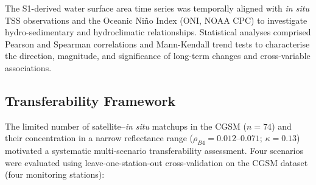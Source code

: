 \documentclass[remotesensing,article,submit,pdftex,moreauthors]{Definitions/mdpi}
\begin{document}
The S1-derived water surface area time series was temporally aligned
with \textit{in situ} TSS observations and the Oceanic Ni\~{n}o Index
(ONI, NOAA CPC) to investigate hydro-sedimentary and hydroclimatic
relationships. Statistical analyses comprised Pearson and Spearman
correlations and Mann-Kendall trend tests to characterise the
direction, magnitude, and significance of long-term changes and
cross-variable associations.
 
 
\subsection{Transferability Framework}
\label{sec:transfer}
 
The limited number of satellite--\textit{in situ} matchups in the CGSM
($n = 74$) and their concentration in a narrow reflectance range
($\rho_{B4} = 0.012$--$0.071$; $\kappa = 0.13$) motivated a systematic
multi-scenario transferability assessment. Four scenarios were
evaluated using leave-one-station-out cross-validation on the CGSM
dataset (four monitoring stations):
 
\end{document}
